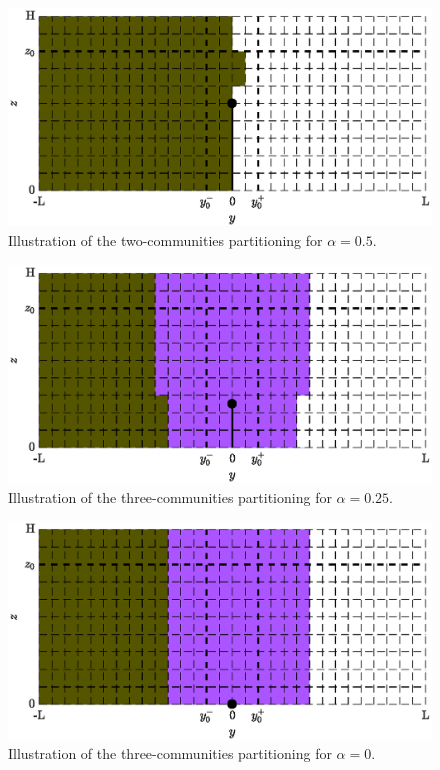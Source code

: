 \begin{figure}[!htp]
	\centering
	\includegraphics[width = .7\textwidth]{fig/problem2box/cluster_a5_2_.eps}
	\caption{Illustration of the two-communities partitioning for $\alpha = 0.5$.}
	\label{fig:cluster_a5_2}
\end{figure}

\begin{figure}[!htp]
	\centering
	\includegraphics[width = .7\textwidth]{fig/problem2box/cluster_a25_3_.eps}
	\caption{Illustration of the three-communities partitioning for $\alpha = 0.25$.}
	\label{fig:cluster_a25_3}
\end{figure}

\begin{figure}[!htp]
	\centering
	\includegraphics[width = .7\textwidth]{fig/problem2box/cluster_a0_3_.eps}
	\caption{Illustration of the three-communities partitioning for $\alpha = 0$.}
	\label{fig:cluster_a0_3}
\end{figure}
